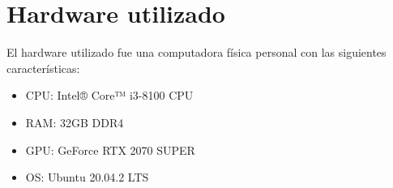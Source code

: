 \section{Hardware utilizado}

El hardware utilizado fue una computadora física personal con las siguientes características:

\begin{itemize}
    \item CPU: Intel® Core™ i3-8100 CPU
    \item RAM: 32GB DDR4
    \item GPU: GeForce RTX 2070 SUPER
    \item OS: Ubuntu 20.04.2 LTS
\end{itemize}
